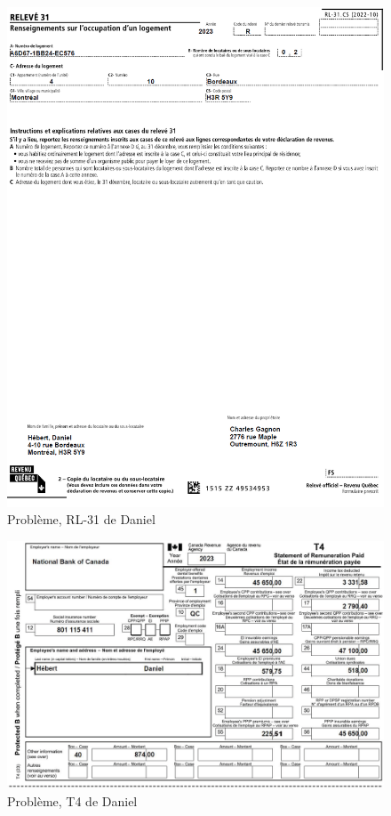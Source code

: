 \begin{figure}
	\centering
	\includegraphics[width=.9\textwidth]{probleme/chapitre-4/Daniel-RL31.png}
	\caption[]{Problème, RL-31 de Daniel}
	\label{fig:chap4ProblemeDanielRL31}
\end{figure}
\begin{figure}
	\centering
	\includegraphics[width=.9\textwidth]{probleme/chapitre-4/Daniel-T4.png}
	\caption[]{Problème, T4 de Daniel}
	\label{fig:chap4ProblemeDanielT4}
\end{figure}
